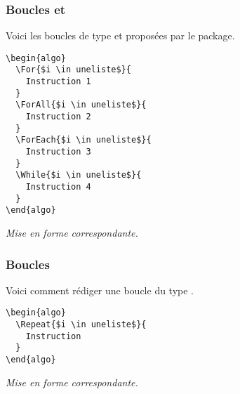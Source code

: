 \documentclass[12pt,a4paper]{article}
\begin{document}
\subsubsection{Boucles \TTfor{} et \TTwhile{}}

Voici les boucles de type \TTfor{} et \TTwhile{} proposées par le package.

\newpage


\begin{multicols}{2}
    \centering
    \begin{frame-gene}
\begin{verbatim}
\begin{algo}
  \For{$i \in uneliste$}{
    Instruction 1
  }
  \ForAll{$i \in uneliste$}{
    Instruction 2
  }
  \ForEach{$i \in uneliste$}{
    Instruction 3
  }
  \While{$i \in uneliste$}{
    Instruction 4
  }
\end{algo}
\end{verbatim}
    \end{frame-gene}
    \vfill\null
    \columnbreak
    \textit{Mise en forme correspondante.}
\begin{algo}
\end{algo}
    \vfill\null
\end{multicols}


\subsubsection{Boucles \TTrepeat{}}

Voici comment rédiger une boucle du type \TTrepeat{}.


\begin{multicols}{2}
    \centering
    \begin{frame-gene}
\begin{verbatim}
\begin{algo}
  \Repeat{$i \in uneliste$}{
    Instruction 
  }
\end{algo}
\end{verbatim}
    \end{frame-gene}
    \vfill\null
    \columnbreak
    \textit{Mise en forme correspondante.}
\begin{algo}
\end{algo}
    \vfill\null
\end{multicols}
\end{document}
